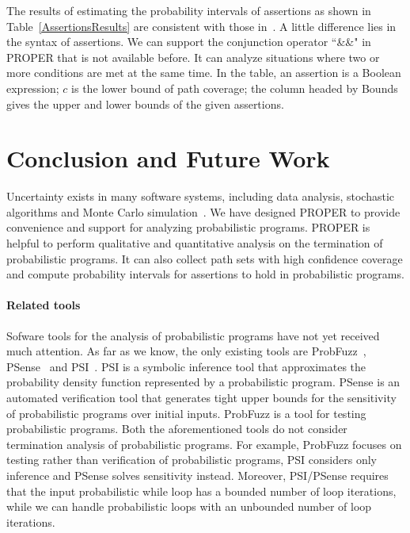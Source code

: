 \documentclass[conference]{IEEEtran}
\begin{document}
The results of estimating the probability intervals of assertions as shown in Table~\ref{AssertionsResults} are consistent with those in~\cite{Sankaranarayanan2013Static}. A little difference lies in the syntax of assertions. We can support the conjunction operator  ``\&\&" in PROPER that is not available before. It can analyze situations where two or more conditions are met at the same time. In the table, an assertion is a Boolean expression; $c$ is the lower bound of path coverage; the column headed by Bounds gives the upper and lower bounds of the given assertions.

\section{Conclusion and Future Work}
Uncertainty exists in many software systems, including data analysis, stochastic algorithms and Monte Carlo simulation~\cite{HASTINGS1970Monte}. We have designed PROPER  to provide convenience and support for analyzing probabilistic programs.
PROPER is helpful to perform qualitative and quantitative analysis on the termination of probabilistic programs. It can also collect path sets with high confidence coverage and compute  probability intervals for assertions to hold in probabilistic programs.

\paragraph{Related tools}
Sofware tools for the analysis of probabilistic programs have not yet received much attention. 
As far as we know, the only existing tools are ProbFuzz~\cite{DBLP:conf/sigsoft/DuttaLHM18}, PSense~\cite{DBLP:conf/atva/HuangWM18} and PSI~\cite{DBLP:conf/cav/GehrMV16}.
PSI is a symbolic inference tool that approximates the probability density function represented by a probabilistic program. 
PSense is an automated verification tool that generates tight upper bounds for the sensitivity of probabilistic programs over initial inputs.
ProbFuzz is a tool for testing probabilistic programs. 
Both the aforementioned tools do not consider termination analysis of probabilistic programs. 
For example, ProbFuzz focuses on testing rather than verification of probabilistic programs, 
PSI considers only inference and PSense solves sensitivity instead. 
Moreover, PSI/PSense requires that the input probabilistic while loop has a bounded number of loop iterations, while we can handle probabilistic loops with an unbounded number of loop iterations.
\end{document}
